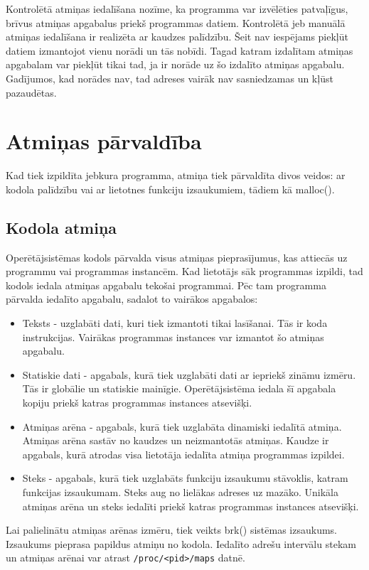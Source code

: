  Kontrolētā atmiņas iedalīšana nozīme, ka programma var izvēlēties patvaļīgus, brīvus atmiņas apgabalus priekš programmas datiem. 
Kontrolētā jeb manuālā atmiņas iedalīšana ir realizēta ar kaudzes palīdzību. 
Šeit nav iespējams piekļūt datiem izmantojot vienu norādi un tās nobīdi. 
Tagad katram izdalītam atmiņas apgabalam var piekļūt tikai tad, ja ir norāde uz šo izdalīto atmiņas apgabalu. 
Gadījumos, kad norādes nav, tad adreses vairāk nav sasniedzamas un kļūst pazaudētas.


\section{Atmiņas pārvaldība}
Kad tiek izpildīta jebkura programma, atmiņa tiek pārvaldīta divos veidos: ar kodola palīdzību vai ar lietotnes funkciju izsaukumiem, tādiem kā malloc().

\subsection{Kodola atmiņa}
Operētājsistēmas kodols pārvalda  visus atmiņas pieprasījumus, kas attiecās uz programmu vai programmas instancēm.
Kad lietotājs sāk programmas izpildi, tad kodols iedala atmiņas apgabalu tekošai programmai.
Pēc tam programma pārvalda iedalīto apgabalu, sadalot to vairākos apgabalos: 
\begin{itemize}
	\item   Teksts - uzglabāti dati, kuri tiek izmantoti tikai lasīšanai. Tās ir koda instrukcijas. 
    Vairākas programmas instances var izmantot šo atmiņas apgabalu.
    \item Statiskie dati - apgabals, kurā tiek uzglabāti dati ar iepriekš zināmu izmēru. Tās ir globālie un statiskie mainīgie.
    Operētājsistēma iedala šī apgabala kopiju priekš katras programmas instances atsevišķi.
    \item Atmiņas arēna - apgabals, kurā tiek uzglabāta dinamiski iedalītā atmiņa. Atmiņas arēna sastāv no kaudzes un neizmantotās atmiņas.
    Kaudze ir apgabals, kurā atrodas visa lietotāja iedalīta atmiņa programmas izpildei.
    \item Steks - apgabals, kurā tiek uzglabāts funkciju izsaukumu stāvoklis, katram funkcijas izsaukumam. Steks aug no lielākas adreses uz mazāko. 
    Unikāla atmiņas arēna un steks iedalīti priekš katras programmas instances atsevišķi.
\end{itemize} 
 Lai palielinātu atmiņas arēnas izmēru, tiek veikts brk() sistēmas izsaukums. Izsaukums pieprasa papildus atmiņu no kodola.
 Iedalīto adrešu intervālu stekam un atmiņas arēnai var atrast \texttt{/proc/<pid>/maps} datnē.
